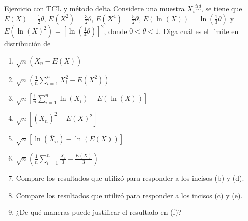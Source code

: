 \documentclass{beamer}
\theoremstyle{definition}
\begin{document}
\begin{frame}{\color{rosee} Ejercicio con TCL y método delta}\small
    Considere una muestra $X_i\stackrel{iid}{\sim}$, se tiene que $E(X)=\frac{1}{2}\theta$, $E(X^2)=\frac{3}{2}\theta$, $E(X^4)=\frac{5}{2}\theta$, $E(\ln(X))=\ln\left(\frac{1}{3}\theta\right)$ y $E(\ln(X)^2)=\left[\ln\left(\frac{1}{4}\theta\right)\right]^2$, donde $0<\theta<1$. Diga cuál es el límite en distribución de
    
    \begin{enumerate}[label=(\alph*)]
        \item  $\sqrt{n}\left(\overline{X}_n-E(X) \right)$
        \item  $\sqrt{n}\left(\frac{1}{n}\sum_{i=1}^{n}X_i^2-E(X^2) \right)$
        \item  $\sqrt{n}\left[\frac{1}{n}\sum_{i=1}^{n}\ln(X_i)-E(\ln(X)) \right]$
        \item  $\sqrt{n}\left[(\overline{X}_n)^2-E(X)^2 \right]$
        \item  $\sqrt{n}\left[\ln(\overline{X}_n)-\ln(E(X)) \right]$
        \item  $\sqrt{n}\left(\frac{1}{n}\sum_{i=1}^{n}\frac{X_i}{3}-\frac{E(X)}{3} \right)$
        \item Compare los resultados que utilizó para responder a los incisos (b) y (d).
        \item Compare los resultados que utilizó para responder a los incisos (c) y (e).
        \item ¿De qué maneras puede justificar el resultado en (f)?
    \end{enumerate}
\end{frame}
\end{document}
